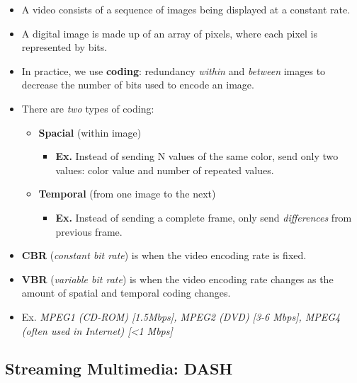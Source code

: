 \documentclass{article}
\begin{document}
\begin{itemize}
\item A video consists of a sequence of images being displayed at a constant rate.
\item A digital image is made up of an array of pixels, where each pixel is represented by bits.
\item In practice, we use {\bf coding}: redundancy \emph{within} and \emph{between} images to decrease the number of bits used to encode an image.
\item There are \emph{two} types of coding:
\begin{itemize}
\item {\bf Spacial} (within image)
\begin{itemize}
\item {\bf Ex.} Instead of sending N values of the same color, send only two values: color value and number of repeated values.
\end{itemize}
\item {\bf Temporal} (from one image to the next)
\begin{itemize}
\item {\bf Ex.} Instead of sending a complete frame, only send \emph{differences} from previous frame.
\end{itemize}
\end{itemize}
\item {\bf CBR} (\emph{constant bit rate}) is when the video encoding rate is fixed.
\item {\bf VBR} (\emph{variable bit rate}) is when the video encoding rate changes as the amount of spatial and temporal coding changes.
\item {Ex.} {\it MPEG1 (CD-ROM) [1.5Mbps], MPEG2 (DVD) [3-6 Mbps], MPEG4 (often used in Internet) [<1 Mbps]}
\end{itemize}

\subsection{Streaming Multimedia: DASH}
\end{document}
